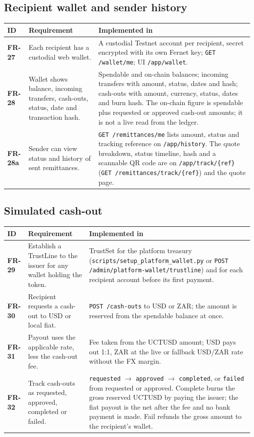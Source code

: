 \documentclass[11pt,a4paper]{article}
\makeatletter
\newcommand{\code}[1]{\texttt{\small #1}}
\newenvironment{frtable}{%
  \rowcolors{2}{white}{rowbg}
  \begin{longtable}{@{}>{\bfseries}l >{\RaggedRight\arraybackslash}p{5.5cm} >{\RaggedRight\arraybackslash}p{8.4cm}@{}}
  \toprule
  \rowcolor{headbg}\textbf{ID} & \textbf{Requirement} & \textbf{Implemented in} \\
  \midrule
  \endhead
  \bottomrule
  \endlastfoot}
 {\end{longtable}}
\makeatother
\begin{document}
\subsection{Recipient wallet and sender history}
\begin{frtable}
FR-27  & Each recipient has a custodial web wallet.
       & A custodial Testnet account per recipient, secret encrypted with its own Fernet key; \code{GET /wallet/me}; UI \code{/app/wallet}. \\
FR-28  & Wallet shows balance, incoming transfers, cash-outs, status, date and transaction hash.
       & Spendable and on-chain balances; incoming transfers with amount, status, dates and hash; cash-outs with amount, currency, status, dates and burn hash. The on-chain figure is spendable plus requested or approved cash-out amounts; it is not a live read from the ledger. \\
FR-28a & Sender can view status and history of sent remittances.
       & \code{GET /remittances/me} lists amount, status and tracking reference on \code{/app/history}. The quote breakdown, status timeline, hash and a scannable QR code are on \code{/app/track/\{ref\}} (\code{GET /remittances/track/\{ref\}}) and the quote page. \\
\end{frtable}

\subsection{Simulated cash-out}
\begin{frtable}
FR-29 & Establish a TrustLine to the issuer for any wallet holding the token.
      & TrustSet for the platform treasury (\code{scripts/setup\_platform\_wallet.py} or \code{POST /admin/platform-wallet/trustline}) and for each recipient account before its first payment. \\
FR-30 & Recipient requests a cash-out to USD or local fiat.
      & \code{POST /cash-outs} to USD or ZAR; the amount is reserved from the spendable balance at once. \\
FR-31 & Payout uses the applicable rate, less the cash-out fee.
      & Fee taken from the UCTUSD amount; USD pays out 1:1, ZAR at the live or fallback USD/ZAR rate without the FX margin. \\
FR-32 & Track cash-outs as requested, approved, completed or failed.
      & \code{requested} $\rightarrow$ \code{approved} $\rightarrow$ \code{completed}, or \code{failed} from requested or approved. Complete burns the gross reserved UCTUSD by paying the issuer; the fiat payout is the net after the fee and no bank payment is made. Fail refunds the gross amount to the recipient's wallet. \\
\end{frtable}
\end{document}
